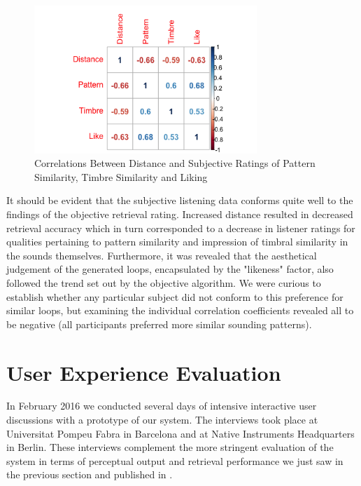 \begin{figure}
	\begin{center}
		\includegraphics[width=0.75\textwidth]{ch07_evaluation/figures/correlation_matrix.png}
	\end{center}
	\caption[Correlations Between Distance and Subjective Ratings of Pattern Similarity, Timbre Similarity and Liking]{Correlations Between Distance and Subjective Ratings of Pattern Similarity, Timbre Similarity and Liking}
	\label{fig:correlation_matrix}
\end{figure}

It should be evident that the subjective listening data conforms quite well to the findings of the objective retrieval rating. Increased distance resulted in decreased retrieval accuracy which in turn corresponded to a decrease in listener ratings for qualities pertaining to pattern similarity and impression of timbral similarity in the sounds themselves. Furthermore, it was revealed that the aesthetical judgement of the generated loops, encapsulated by the "likeness" factor, also followed the trend set out by the objective algorithm. We were curious to establish whether any particular subject did not conform to this preference for similar loops, but examining the individual correlation coefficients revealed all to be negative (all participants preferred more similar sounding patterns).

\section{User Experience Evaluation}

In February 2016 we conducted several days of intensive interactive user discussions with a prototype of our system. The interviews took place at Universitat Pompeu Fabra in Barcelona and at Native Instruments Headquarters in Berlin. These interviews complement the more stringent evaluation of the system in terms of perceptual output and retrieval performance  we just saw in the previous section and published in \cite{Nuanain2016b}.

